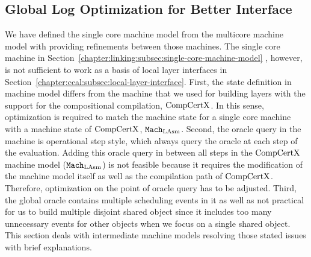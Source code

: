 
\subsection{Global Log Optimization for Better Interface}
\label{chapter:linking:subsec:global-log-optimization}

We have defined the single core machine model from the multicore machine model with providing refinements between those machines. 
The single core machine in Section~\ref{chapter:linking:subsec:single-core-machine-model} , however, 
is not sufficient to work as a 
basis of local layer interfaces in Section~\ref{chapter:ccal:subsec:local-layer-interface}. 
First, the state definition in machine model differs from the machine that we used for building layers with the support for the compositional compilation, $\mathrm{CompCertX}$. 
In this sense, optimization is required to match the machine state for a single core machine with a machine state of $\mathrm{CompCertX}$, ${\mathrm{\texttt{Mach}}}_{\mathrm{LAsm}}$. 
Second, the oracle query in the machine is operational step style, 
which always query the oracle at each step of the evaluation.
Adding this oracle query in between all steps in the $\mathrm{CompCertX}$ machine model (${\mathrm{\texttt{Mach}}}_{\mathrm{LAsm}}$) is not feasible because it requires the modification of the machine model itself as well as the compilation path of $\mathrm{CompCertX}$. 
Therefore, 
optimization on the point of oracle query has to be adjusted. 
Third, the global oracle contains multiple scheduling events in it as well as not practical for us to build multiple disjoint shared object since it includes too many unnecessary events for other objects when we focus on a single shared object. 
This section deals with intermediate machine models resolving those stated issues with brief explanations. 



